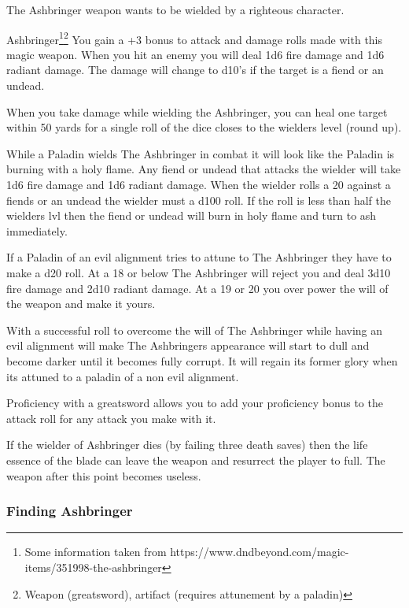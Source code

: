 The Ashbringer weapon wants to be wielded by a righteous character. 

\begin{commentbox}{Ashbringer\footnote{Some information taken from https://www.dndbeyond.com/magic-items/351998-the-ashbringer}\footnote{Weapon (greatsword), artifact (requires attunement by a paladin)}}	
	You gain a +3 bonus to attack and damage rolls made with this magic weapon. When you hit an enemy you will deal 1d6 fire damage and 1d6 radiant damage. The damage will change to d10's if the target is a fiend or an undead.
	
	When you take damage while wielding the Ashbringer, you can heal one target within 50 yards for a single roll of the dice closes to the wielders level (round up).
	
	While a Paladin wields The Ashbringer in combat it will look like the Paladin is burning with a holy flame. Any fiend or undead that attacks the wielder will take 1d6 fire damage and 1d6 radiant damage. When the wielder rolls a 20 against a fiends or an undead the wielder must a d100 roll. If the roll is less than half the wielders lvl then the fiend or undead will burn in holy flame and turn to ash immediately.
	
	If a Paladin of an evil alignment tries to attune to The Ashbringer they have to make a d20 roll. At a 18 or below The Ashbringer will reject you and deal 3d10 fire damage and 2d10 radiant damage. At a 19 or 20 you over power the will of the weapon and make it yours.
	
	With a successful roll to overcome the will of The Ashbringer while having an evil alignment will make The Ashbringers appearance will start to dull and become darker until it becomes fully corrupt. It will regain its former glory when its attuned to a paladin of a non evil alignment.
	
	Proficiency with a greatsword allows you to add your proficiency bonus to the attack roll for any attack you make with it.
	
	If the wielder of Ashbringer dies (by failing three death saves) then the life essence of the blade can leave the weapon and resurrect the player to full. The weapon after this point becomes useless.
\end{commentbox}

\subsubsection{Finding Ashbringer}

